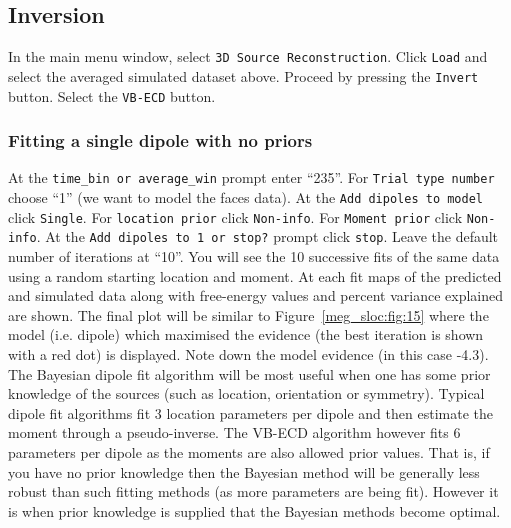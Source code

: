 \subsection{Inversion}
In the main menu window, select \texttt{3D Source Reconstruction}. Click \texttt{Load} and select the averaged simulated dataset above.
Proceed by pressing the \texttt{Invert} button. Select the \texttt{VB-ECD} button.

\subsubsection{Fitting a single dipole with no priors}
At the \texttt{time\_bin or average\_win} prompt enter ``235''. For \texttt{Trial type number} choose ``1'' (we want to model the faces data). At the \texttt{Add dipoles to model} click \texttt{Single}. For \texttt{location prior} click \texttt{Non-info}. For \texttt{Moment prior} click \texttt{Non-info}. At the \texttt{Add dipoles to 1 or stop?} prompt click \texttt{stop}. Leave the default number of iterations at ``10''.
You will see the 10 successive fits of the same data using a random starting location and moment. At each fit maps of the predicted and simulated data along with free-energy values and percent variance explained are shown. The final plot will be similar to Figure~\ref{meg_sloc:fig:15} where the model (i.e. dipole) which maximised the evidence (the best iteration is shown with a red dot) is displayed. Note down the model evidence (in this case -4.3). The Bayesian dipole fit algorithm will be most useful when one has some prior knowledge of the sources (such as location, orientation or symmetry). Typical dipole fit algorithms fit 3 location parameters per dipole and then estimate the moment through a pseudo-inverse. The VB-ECD algorithm however fits 6 parameters per dipole as the moments are also allowed prior values. That is, if you have no prior knowledge then the Bayesian method will be generally less robust than such fitting methods (as more parameters are being fit). However it is when prior knowledge is supplied that the Bayesian methods become optimal.

